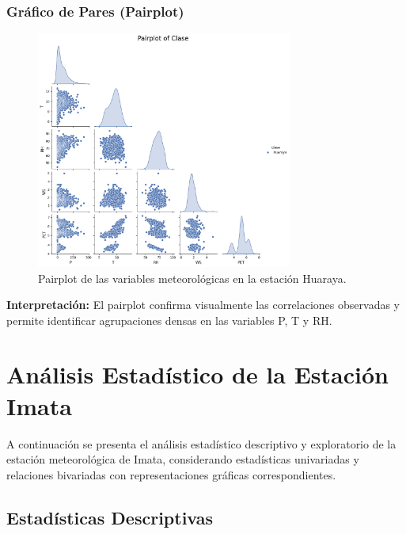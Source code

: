 \subsubsection*{Gráfico de Pares (Pairplot)}
\begin{figure}[htbp]
\centering
\includegraphics[width=0.75\textwidth]{resultados/por_estacion_meteorologica/Huaraya/pairplot.png}
\caption{Pairplot de las variables meteorológicas en la estación Huaraya.}
\label{fig:huaraya_pairplot}
\end{figure}
\textbf{Interpretación:} El pairplot confirma visualmente las correlaciones observadas y permite identificar agrupaciones densas en las variables P, T y RH.



\section{Análisis Estadístico de la Estación Imata}

A continuación se presenta el análisis estadístico descriptivo y exploratorio de la estación meteorológica de Imata, considerando estadísticas univariadas y relaciones bivariadas con representaciones gráficas correspondientes.

\subsection{Estadísticas Descriptivas}

